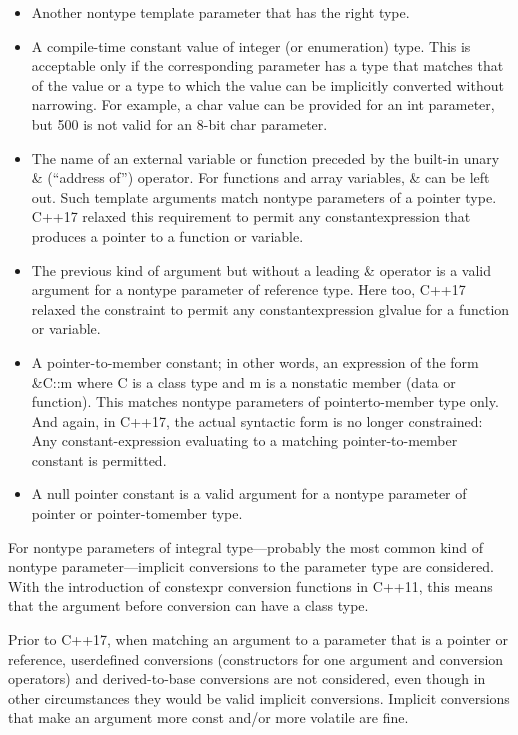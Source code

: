 \begin{itemize}
\item 
Another nontype template parameter that has the right type.

\item
A compile-time constant value of integer (or enumeration) type. This is acceptable only if the corresponding parameter has a type that matches that of the value or a type to which the value can be implicitly converted without narrowing. For example, a char value can be provided for an int parameter, but 500 is not valid for an 8-bit char parameter.

\item 
The name of an external variable or function preceded by the built-in unary \& (“address of”) operator. For functions and array variables, \& can be left out. Such template arguments match nontype parameters of a pointer type. C++17 relaxed this requirement to permit any constantexpression that produces a pointer to a function or variable.

\item 
The previous kind of argument but without a leading \& operator is a valid argument for a nontype parameter of reference type. Here too, C++17 relaxed the constraint to permit any constantexpression glvalue for a function or variable.

\item 
A pointer-to-member constant; in other words, an expression of the form \&C::m where C is a class type and m is a nonstatic member (data or function). This matches nontype parameters of pointerto-member type only. And again, in C++17, the actual syntactic form is no longer constrained: Any constant-expression evaluating to a matching pointer-to-member constant is permitted.

\item 
A null pointer constant is a valid argument for a nontype parameter of pointer or pointer-tomember type.
\end{itemize}

For nontype parameters of integral type—probably the most common kind of nontype parameter—implicit conversions to the parameter type are considered. With the introduction of constexpr conversion functions in C++11, this means that the argument before conversion can have a class type.

Prior to C++17, when matching an argument to a parameter that is a pointer or reference, userdefined conversions (constructors for one argument and conversion operators) and derived-to-base conversions are not considered, even though in other circumstances they would be valid implicit conversions. Implicit conversions that make an argument more const and/or more volatile are fine.


